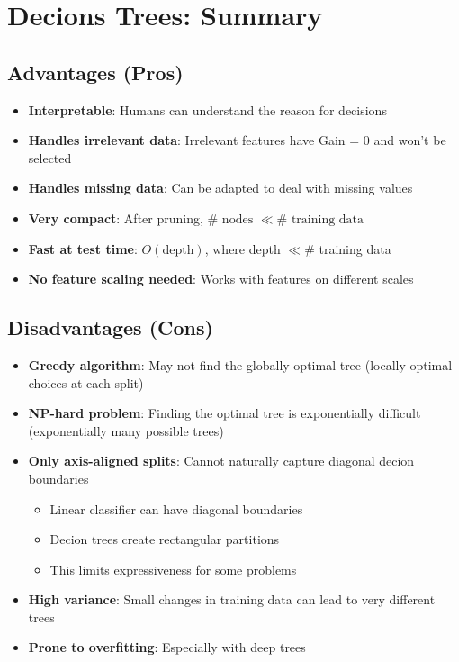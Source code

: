 \documentclass[a4paper]{article}
\theoremstyle{definition}
\begin{document}
\section{Decions Trees: Summary}
\subsection{Advantages (Pros)}
\begin{itemize}
    \item \textbf{Interpretable}: Humans can understand the reason for decisions
    \item \textbf{Handles irrelevant data}: Irrelevant features have Gain = 0 and won't be selected 
    \item \textbf{Handles missing data}: Can be adapted to deal with missing values 
    \item \textbf{Very compact}: After pruning, \( \# \text{ nodes } \ll \# \text{ training data} \)
    \item \textbf{Fast at test time}: \( O(\text{depth}) \), where depth \( \ll \# \) training data
    \item \textbf{No feature scaling needed}: Works with features on different scales
\end{itemize}
\subsection{Disadvantages (Cons)}
\begin{itemize}
    \item \textbf{Greedy algorithm}: May not find the globally optimal tree (locally optimal choices at each split)
    \item \textbf{NP-hard problem}: Finding the optimal tree is exponentially difficult (exponentially many possible trees)
    \item \textbf{Only axis-aligned splits}: Cannot naturally capture diagonal decion boundaries 
    \begin{itemize}
        \item Linear classifier can have diagonal boundaries 
        \item Decion trees create rectangular partitions 
        \item This limits expressiveness for some problems
    \end{itemize}
    \item \textbf{High variance}: Small changes in training data can lead to very different trees
    \item \textbf{Prone to overfitting}: Especially with deep trees
\end{itemize}
\end{document}
